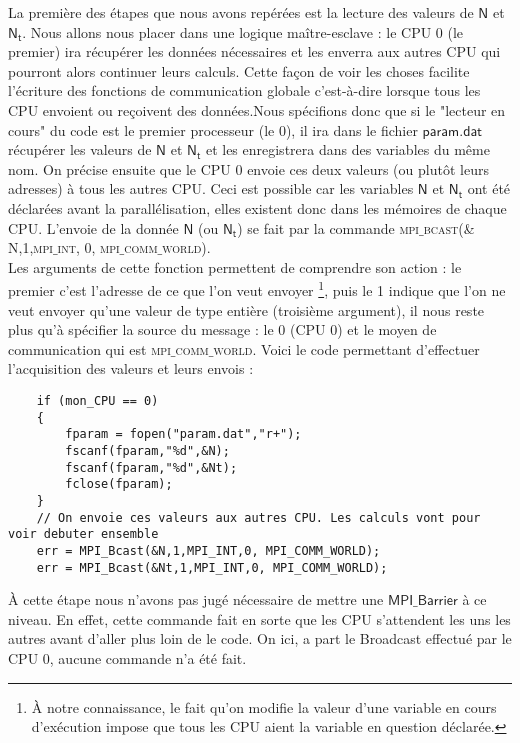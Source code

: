 \documentclass[french]{article}
\newcommand{\cad}{c'est-à-dire}
\begin{document}
La première des étapes que nous avons repérées est la lecture des valeurs de $\mathsf{N}$ et $\mathsf{N_t}$. Nous allons nous placer dans une logique maître-esclave : le CPU 0 (le premier) ira récupérer les données nécessaires et les enverra aux autres CPU qui pourront alors continuer leurs calculs. Cette façon de voir les choses facilite l'écriture des fonctions de communication globale \cad $ $ lorsque tous les CPU envoient ou reçoivent des données.Nous spécifions donc que si le "lecteur en cours" du code est le premier processeur (le 0), il ira dans le fichier $\mathsf{param.dat}$ récupérer les valeurs de $\mathsf{N}$ et $\mathsf{N_t}$ et les enregistrera dans des variables du même nom. On précise ensuite que le CPU 0 envoie ces deux valeurs (ou plutôt leurs adresses) à tous les autres CPU. Ceci est possible car les variables $\mathsf{N}$ et $\mathsf{N_t}$ ont été déclarées avant la parallélisation, elles existent donc dans les mémoires de chaque CPU.
L'envoie de la donnée $\mathsf{N}$ (ou $\mathsf{N_t}$) se fait par la commande \textsc{mpi$\_$bcast(\& N,1,mpi$\_$int, 0, mpi$\_$comm$\_$world)}.\\
Les arguments de cette fonction permettent de comprendre son action : le premier c'est l'adresse de ce que l'on veut envoyer \footnote{À notre connaissance, le fait qu'on modifie la valeur d'une variable en cours d'exécution impose que tous les CPU aient la variable en question déclarée.}, puis le 1 indique que l'on ne veut envoyer qu'une valeur de type entière (troisième argument), il nous reste plus qu'à spécifier la source du message : le 0 (CPU 0) et le moyen de communication qui est \textsc{mpi$\_$comm$\_$world}. Voici le code permettant d'effectuer l'acquisition des valeurs et leurs envois :

\begin{lstlisting}
	if (mon_CPU == 0)
    {
        fparam = fopen("param.dat","r+"); 
        fscanf(fparam,"%d",&N);
        fscanf(fparam,"%d",&Nt);
        fclose(fparam);
    }
    // On envoie ces valeurs aux autres CPU. Les calculs vont pour voir debuter ensemble
    err = MPI_Bcast(&N,1,MPI_INT,0, MPI_COMM_WORLD);
    err = MPI_Bcast(&Nt,1,MPI_INT,0, MPI_COMM_WORLD);
\end{lstlisting}

À cette étape nous n'avons pas jugé nécessaire de mettre une $\mathsf{MPI\_ Barrier}$ à ce niveau. En effet, cette commande fait en sorte que les CPU s'attendent les uns les autres avant d'aller plus loin de le code. On ici, a part le Broadcast effectué par le CPU 0, aucune commande n'a été fait.
\end{document}
